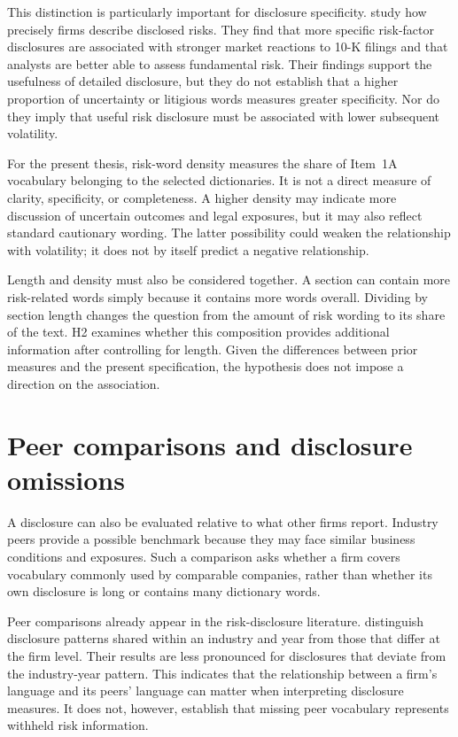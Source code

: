 This distinction is particularly important for disclosure specificity.
\textcite{hope2016} study how precisely firms describe disclosed risks. They
find that more specific risk-factor disclosures are associated with stronger
market reactions to 10-K filings and that analysts are better able to assess
fundamental risk. Their findings support the usefulness of detailed
disclosure, but they do not establish that a higher proportion of uncertainty
or litigious words measures greater specificity. Nor do they imply that useful
risk disclosure must be associated with lower subsequent volatility.

For the present thesis, risk-word density measures the share of Item~1A
vocabulary belonging to the selected dictionaries. It is not a direct measure
of clarity, specificity, or completeness. A higher density may indicate more
discussion of uncertain outcomes and legal exposures, but it may also reflect
standard cautionary wording. The latter possibility could weaken the
relationship with volatility; it does not by itself predict a negative
relationship.

Length and density must also be considered together. A section can contain
more risk-related words simply because it contains more words overall.
Dividing by section length changes the question from the amount of risk wording
to its share of the text. H2 examines whether this composition provides
additional information after controlling for length. Given the differences
between prior measures and the present specification, the hypothesis does not
impose a direction on the association.

\section{Peer comparisons and disclosure omissions}

A disclosure can also be evaluated relative to what other firms report.
Industry peers provide a possible benchmark because they may face similar
business conditions and exposures. Such a comparison asks whether a firm
covers vocabulary commonly used by comparable companies, rather than whether
its own disclosure is long or contains many dictionary words.

Peer comparisons already appear in the risk-disclosure literature.
\textcite{kravet2013} distinguish disclosure patterns shared within an industry
and year from those that differ at the firm level. Their results are less
pronounced for disclosures that deviate from the industry-year pattern. This
indicates that the relationship between a firm's language and its peers'
language can matter when interpreting disclosure measures. It does not,
however, establish that missing peer vocabulary represents withheld risk
information.

